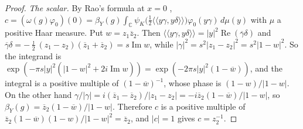 \documentclass[10pt]{amsart}
\theoremstyle{definition}
\theoremstyle{remark}
\newcommand{\C}{\mathbb C}
\providecommand{\aubar}[1]{\overline{#1}}
\begin{document}
\begin{proof}
\emph{The scalar.} By Rao's formula at $x=0$ \cite[p.~400]{KudlaSplitting},
$c=(\omega(g)\varphi_0)(0)=\beta_Y(g)\int_\C\psi_K\bigl(\tfrac12\langle\!\langle y\gamma,y\delta\rangle\!\rangle
\bigr)\varphi_0(y\gamma)\,d\mu(y)$ with $\mu$ a positive Haar measure. Put $w=z_1\aubar z_2$. Then
$\langle\!\langle y\gamma,y\delta\rangle\!\rangle=|y|^2\operatorname{Re}(\aubar\gamma\delta)$ and
$\aubar\gamma\delta=-\frac\jmath2(z_1-z_2)(\aubar z_1+\aubar z_2)=s\operatorname{Im}w$, while
$|\gamma|^2=s^2|z_1-z_2|^2=s^2|1-w|^2$. So the integrand is $\exp(-\pi s|y|^2(|1-w|^2+2i\operatorname{Im}w))
=\exp(-2\pi s|y|^2(1-\aubar w))$, and the integral is a positive multiple of $(1-\aubar w)^{-1}$,
whose phase is $(1-w)/|1-w|$. On the other hand $\gamma/|\gamma|=i(\aubar z_1-\aubar z_2)/|z_1-z_2|=
-i\aubar z_2(1-\aubar w)/|1-w|$, so $\beta_Y(g)=\aubar z_2(1-\aubar w)/|1-w|$. Therefore $c$ is a
positive multiple of $\aubar z_2(1-\aubar w)(1-w)/|1-w|^2=\aubar z_2$, and $|c|=1$ gives $c=z_2^{-1}$.
\end{proof}
\end{document}
